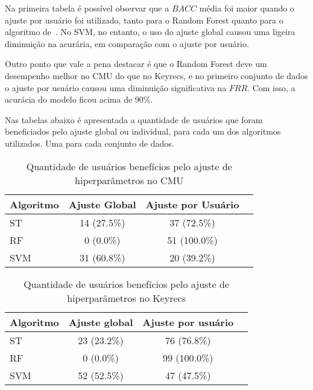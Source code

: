 Na primeira tabela é possível observar que a $BACC$ média foi maior quando o ajuste por usuário foi utilizado, tanto para o Random Forest quanto para o algoritmo de~. No SVM, no entanto, o uso do ajuste global causou uma ligeira diminuição na acurária, em comparação com o ajuste por usuário.

Outro ponto que vale a pena destacar é que o Random Forest deve um desempenho melhor no CMU do que no Keyrecs, e no primeiro conjunto de dados o ajuste por usuário causou uma diminuição significativa na $FRR$. Com isso, a acurácia do modelo ficou acima de 90\%.

Nas tabelas abaixo é apresentada a quantidade de usuários que foram beneficiados pelo ajuste global ou individual, para cada um dos algoritmos utilizados. Uma para cada conjunto de dados.

\begin{table}[htbp]
\centering
\caption{Quantidade de usuários benefícios pelo ajuste de hiperparâmetros no CMU}
\label{tab:cmu_hp_comparison_extended}
\begin{tabular}{|l|c|c|c|}
\hline
\textbf{Algoritmo} & \textbf{Ajuste Global} & \textbf{Ajuste por Usuário} \\
\hline
ST & 14 (27.5\%) & 37 (72.5\%) \\
\hline
RF & 0 (0.0\%) & 51 (100.0\%) \\
\hline
SVM & 31 (60.8\%) & 20 (39.2\%) \\
\hline
\end{tabular}
\end{table}

\begin{table}[htbp]
\centering
\caption{Quantidade de usuários benefícios pelo ajuste de hiperparâmetros no Keyrecs}
\label{tab:keyrecs_hp_comparison_extended}
\begin{tabular}{|l|c|c|c|}
\hline
\textbf{Algoritmo} & \textbf{Ajuste global} & \textbf{Ajuste por usuário} \\
\hline
ST & 23 (23.2\%) & 76 (76.8\%) \\
\hline
RF & 0 (0.0\%) & 99 (100.0\%) \\
\hline
SVM & 52 (52.5\%) & 47 (47.5\%) \\
\hline
\end{tabular}
\end{table}

